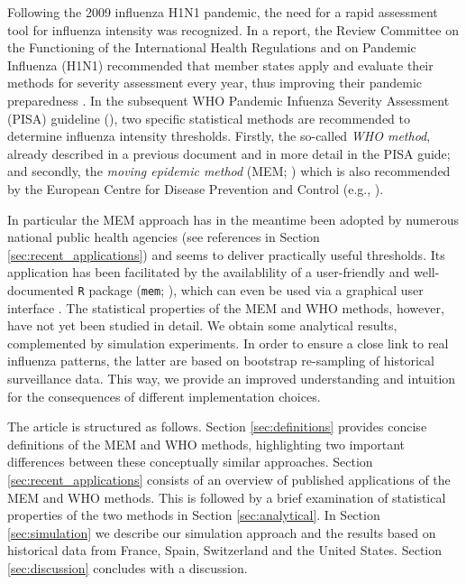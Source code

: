 \documentclass{article}
\begin{document}
Following the 2009 influenza H1N1 pandemic, the need for a rapid assessment tool for influenza intensity was recognized. In a report, the Review Committee on the Functioning of the
International Health Regulations and on Pandemic Influenza (H1N1) recommended that member states apply and evaluate their methods for severity assessment every year, thus improving their pandemic preparedness \citep[p.118]{WHO2011}. In the subsequent WHO Pandemic Infuenza Severity Assessment (PISA) guideline (\citeyear{WHO2017}), two specific statistical methods are recommended to determine influenza intensity thresholds. Firstly, the so-called \textit{WHO method}, already described in a previous document \citep{WHO2014} and in more detail in the PISA guide; and secondly, the \textit{moving epidemic method} (MEM; \citealt{Vega2013, Vega2015}) which is also recommended by the European Centre for Disease Prevention and Control (e.g., \citealt{ECDC2017}).

In particular the MEM approach has in the meantime been adopted by numerous national public health agencies (see references in Section \ref{sec:recent_applications}) and seems to deliver practically useful thresholds. Its application has been facilitated by the availablility of a user-friendly and well-documented \texttt{R} package (\texttt{mem}; \citealt{Lozano2020}), which can even be used via a graphical user interface \citep{Lozano2018}. The statistical properties of the MEM and WHO methods, however, have not yet been studied in detail. We obtain some analytical results, complemented by simulation experiments. In order to ensure a close link to real influenza patterns, the latter are based on bootstrap re-sampling of historical surveillance data. This way, we provide an improved understanding and intuition for the consequences of different implementation choices.

The article is structured as follows. Section \ref{sec:definitions} provides concise definitions of the MEM and WHO methods, highlighting two important differences between these conceptually similar approaches. Section \ref{sec:recent_applications} consists of an overview of published applications of the MEM and WHO methods. This is followed by a brief examination of statistical properties of the two methods in Section \ref{sec:analytical}. In Section \ref{sec:simulation} we describe our simulation approach and the results based on historical data from France, Spain, Switzerland and the United States. Section \ref{sec:discussion} concludes with a discussion.
\end{document}
